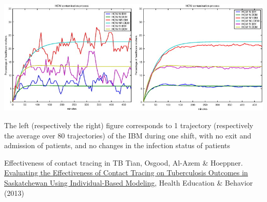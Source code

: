 \documentclass[aspectratio=43]{beamer}
\begin{document}
\begin{frame}
\begin{center}
\includegraphics[width=\textwidth]{FIGS/Dagata_etal_comparisons.jpg}
\end{center}
\vfill
\tiny 
The left (respectively the right) figure corresponds to 1 trajectory (respectively the average over 80 trajectories) of the IBM during one shift, with no exit and admission of patients, and no changes in the infection status of patients
\end{frame}


\begin{frame}{Effectiveness of contact tracing in TB}
Tian, Osgood, Al-Azem \& Hoeppner. \href{https://doi-org.uml.idm.oclc.org/10.1177\%2F1090198113493910}{Evaluating the Effectiveness of Contact Tracing on Tuberculosis Outcomes in Saskatchewan Using Individual-Based Modeling}, Health Education \& Behavior (2013)
\end{frame}
\end{document}
